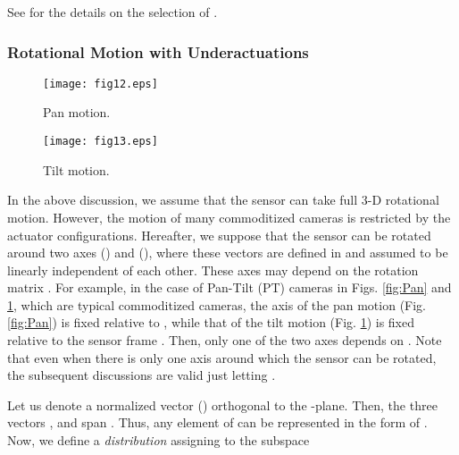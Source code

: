 \documentclass[conference,letterpaper]{ieeeconf}
\begin{document}
See \cite{AMS_BK} for the details on the selection of .



\subsubsection*{Rotational Motion with Underactuations}



\begin{figure}[t]
\begin{center}
\begin{minipage}{4cm}
\begin{center}
\texttt{[image: fig12.eps]}
\caption{Pan motion.}
\label{fig:Pan}
\end{center}
\end{minipage}
\hspace{.2cm}
\begin{minipage}{4cm}
\begin{center}
\texttt{[image: fig13.eps]}
\caption{Tilt motion.}
\label{fig:Tilt}
\end{center}
\end{minipage}
\end{center}
\end{figure}




In the above discussion, we assume that the sensor can take full 3-D
rotational motion.
However, the motion of many commoditized cameras is restricted by
the actuator configurations.
Hereafter, we suppose that the sensor can be rotated 
around two axes  () and  (),
where these vectors are defined in  and assumed to be
linearly independent of each other.
These axes may depend on the rotation matrix .
For example, in the case of
Pan-Tilt (PT) cameras in Figs. \ref{fig:Pan} and \ref{fig:Tilt}, which are
typical commoditized cameras, 
the axis of the pan motion (Fig. \ref{fig:Pan}) 
is fixed relative to , 
while that of the tilt motion (Fig. \ref{fig:Tilt}) is fixed
relative to the sensor frame .
Then, only one of the two axes depends on .
Note that even when there is only one axis around which the sensor can be rotated, 
the subsequent discussions are valid just letting .







Let us denote a normalized vector  ()
orthogonal to the -plane.
Then, the three vectors ,  and 
 span .
Thus, any element  of  can be represented in the form of
.
Now, we define a {\it distribution}  \cite{MLS_BK} assigning
 to the subspace 
\end{document}
